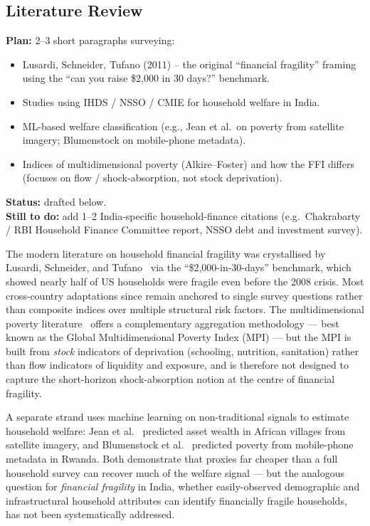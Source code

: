 \documentclass[colorlinks,balance]{asmeconf}
\begin{document}
\subsection{Literature Review}
\begin{outline}
\textbf{Plan:} 2--3 short paragraphs surveying:
\begin{itemize}
\item Lusardi, Schneider, Tufano (2011) -- the original ``financial fragility'' framing using the ``can you raise \$2{,}000 in 30 days?'' benchmark.
\item Studies using IHDS / NSSO / CMIE for household welfare in India.
\item ML-based welfare classification (e.g., Jean et al.\ on poverty from satellite imagery; Blumenstock on mobile-phone metadata).
\item Indices of multidimensional poverty (Alkire--Foster) and how the FFI differs (focuses on flow / shock-absorption, not stock deprivation).
\end{itemize}
\textbf{Status:} drafted below.\\
\textbf{Still to do:} add 1--2 India-specific household-finance citations (e.g.\ Chakrabarty / RBI Household Finance Committee report, NSSO debt and investment survey).
\end{outline}
The modern literature on household financial fragility was crystallised by Lusardi, Schneider, and Tufano~\cite{lusardi2011fragility} via the ``\$2{,}000-in-30-days'' benchmark, which showed nearly half of US households were fragile even before the 2008 crisis. Most cross-country adaptations since remain anchored to single survey questions rather than composite indices over multiple structural risk factors. The multidimensional poverty literature~\cite{alkire2011counting} offers a complementary aggregation methodology --- best known as the Global Multidimensional Poverty Index (MPI) --- but the MPI is built from \emph{stock} indicators of deprivation (schooling, nutrition, sanitation) rather than flow indicators of liquidity and exposure, and is therefore not designed to capture the short-horizon shock-absorption notion at the centre of financial fragility.

A separate strand uses machine learning on non-traditional signals to estimate household welfare: Jean et al.~\cite{jean2016poverty} predicted asset wealth in African villages from satellite imagery, and Blumenstock et al.~\cite{blumenstock2015predicting} predicted poverty from mobile-phone metadata in Rwanda. Both demonstrate that proxies far cheaper than a full household survey can recover much of the welfare signal --- but the analogous question for \emph{financial fragility} in India, whether easily-observed demographic and infrastructural household attributes can identify financially fragile households, has not been systematically addressed.
\end{document}
